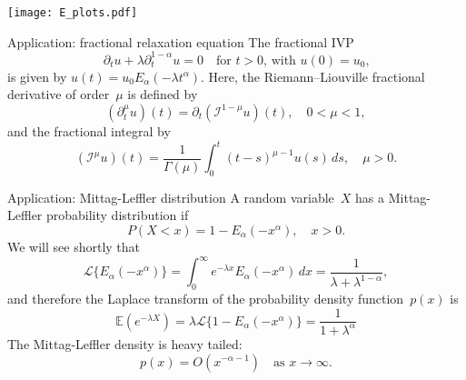 \documentclass{beamer}
\begin{document}
\begin{frame}
\begin{center}
\texttt{[image: E\_plots.pdf]}
\end{center}
\end{frame}
\begin{frame}{Application: fractional relaxation equation}
The fractional IVP
\[
\partial_t u+\lambda\partial_t^{1-\alpha}u=0
    \quad\text{for $t>0$, with $u(0)=u_0$,}
\]
is given by $u(t)=u_0 E_\alpha(-\lambda t^\alpha)$.
\vfill
Here, the Riemann--Liouville fractional derivative of order~$\mu$ is defined 
by
\[
(\partial_t^\mu u)(t)=\partial_t(\mathcal{I}^{1-\mu}u)(t),\quad0<\mu<1,
\]
and the fractional integral by
\[
(\mathcal{I}^\mu u)(t)=\frac{1}{\Gamma(\mu)}\int_0^t(t-s)^{\mu-1}u(s)\,ds,
\quad\mu>0.
\]
\end{frame}

\begin{frame}{Application: Mittag-Leffler distribution}
A random variable~$X$ has a Mittag-Leffler probability distribution if
\[
P(X<x)=1-E_\alpha(-x^\alpha),\quad x>0.
\]
We will see shortly that 
\[
\mathcal{L}\{E_\alpha(-x^\alpha)\}=\int_0^\infty 
    e^{-\lambda x}E_\alpha(-x^\alpha)\,dx=\frac{1}{\lambda+\lambda^{1-\alpha}},
\]
and therefore the Laplace transform of the probability density function~$p(x)$ 
is
\[
\mathbb{E}(e^{-\lambda X})=\lambda\mathcal{L}\{1-E_\alpha(-x^\alpha)\}
    =\frac{1}{1+\lambda^\alpha}
\]
The Mittag-Leffler density is heavy tailed:
\[
p(x)=O(x^{-\alpha-1})\quad\text{as $x\to\infty$.}
\]
\end{frame}
\end{document}
